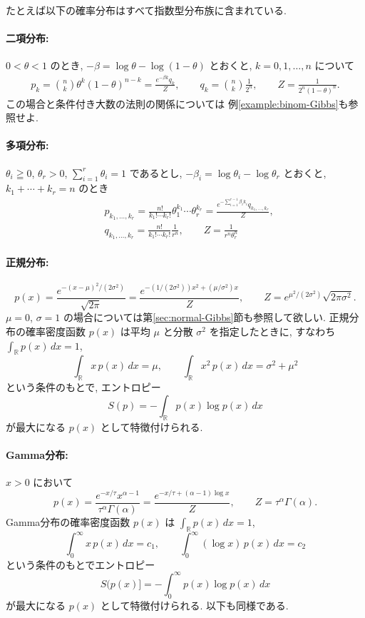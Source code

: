 \documentclass[12pt,twoside]{jarticle}
\newcommand\R{{\mathbb R}} %
\theoremstyle{definition} %
\theoremstyle{definition} %
\theoremstyle{definition} %
\numberwithin{theorem}{section}
\numberwithin{equation}{section}
\numberwithin{figure}{section}
\numberwithin{table}{section}
\newcommand\secref[1]{第\ref{#1}節}
\newcommand\exampleref[1]{例\ref{#1}}
\begin{document}
たとえば以下の確率分布はすべて指数型分布族に含まれている.

\paragraph{二項分布:} $0<\theta<1$ のとき,
$-\beta=\log\theta-\log(1-\theta)$ とおくと, $k=0,1,\ldots,n$ について
\begin{align*}
p_k 
= \binom{n}{k} \theta^k(1-\theta)^{n-k}
=\frac{e^{-\beta k}q_k}{Z},
\qquad
q_k = \binom{n}{k}\frac{1}{2^n}, 
\qquad
Z = \frac{1}{2^n(1-\theta)^n}.
\end{align*}
この場合と条件付き大数の法則の関係については
\exampleref{example:binom-Gibbs}も参照せよ.

\paragraph{多項分布:} $\theta_i\geqq 0$, $\theta_r>0$, $\sum_{i=1}^r\theta_i=1$ であるとし, 
$-\beta_i=\log\theta_i-\log\theta_r$ とおくと, \\
$k_1+\cdots+k_r=n$ のとき
\begin{align*}
&
p_{k_1,\ldots,k_r}
=
\frac{n!}{k_1!\cdots k_r!}\theta_1^{k_1}\cdots \theta_r^{k_r}
=\frac{e^{-\sum_{i=1}^{r-1}\beta_i k_i}q_{k_1,\ldots,k_r}}{Z},
\\ &
q_{k_1,\ldots,k_r}
=\frac{n!}{k_1!\cdots k_r!}\frac{1}{r^n},
\qquad
Z=\frac{1}{r^n\theta_r^n}
\end{align*}

\paragraph{正規分布:}
\[
p(x) 
= \frac{e^{-(x-\mu)^2/(2\sigma^2)}}{\sqrt{2\pi}}
= \frac{e^{-(1/(2\sigma^2))x^2+(\mu/\sigma^2)x}}{Z},
\qquad Z=e^{\mu^2/(2\sigma^2)}\sqrt{2\pi\sigma^2}.
\]
$\mu=0$, $\sigma=1$ の場合については\secref{sec:normal-Gibbs}も参照して欲しい.
正規分布の確率密度函数 $p(x)$ は平均 $\mu$ と分散 $\sigma^2$ を指定したときに, 
すなわち $\int_\R p(x)\,dx=1$, 
\[
\int_\R x\,p(x)\,dx=\mu, \qquad
\int_\R x^2\,p(x)\,dx = \sigma^2+\mu^2
\]
という条件のもとで, エントロピー
\[
S(p) = -\int_\R p(x)\log p(x)\,dx
\]
が最大になる $p(x)$ として特徴付けられる.

\paragraph{Gamma分布:} $x>0$ において
\[
p(x)=\frac{e^{-x/\tau}x^{\alpha-1}}{\tau^{\alpha}\Gamma(\alpha)}
=\frac{e^{-x/\tau+(\alpha-1)\log x}}{Z}, 
\qquad
Z=\tau^{\alpha}\Gamma(\alpha).
\]
Gamma分布の確率密度函数 $p(x)$ は $\int_\R p(x)\,dx=1$, 
\[
\int_0^\infty x\,p(x)\,dx=c_1, \qquad
\int_0^\infty (\log x)\, p(x)\,dx = c_2
\]
という条件のもとでエントロピー
\[
S(p(x)] = - \int_0^\infty p(x)\log p(x)\,dx
\]
が最大になる $p(x)$ として特徴付けられる. 以下も同様である.
\end{document}
